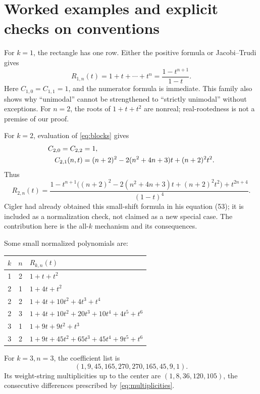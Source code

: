 \documentclass[11pt,a4paper]{article}
\theoremstyle{definition}
\theoremstyle{remark}
\numberwithin{equation}{section}
\begin{document}
\section{Worked examples and explicit checks on conventions}
\label{sec:examples}
For \(k=1\), the rectangle has one row. Either the positive formula or
Jacobi--Trudi gives
\begin{equation}
 R_{1,n}(t)=1+t+\cdots+t^n=\frac{1-t^{n+1}}{1-t}.
 \label{eq:k1}
\end{equation}
Here \(C_{1,0}=C_{1,1}=1\), and the numerator formula is immediate.
This family also shows why ``unimodal'' cannot be strengthened to
``strictly unimodal'' without exceptions. For \(n=2\), the roots of
\(1+t+t^2\) are nonreal; real-rootedness is not a premise of our proof.

For \(k=2\), evaluation of \eqref{eq:blocks} gives
\begin{align}
 C_{2,0}=C_{2,2}&=1,\notag\\
 C_{2,1}(n,t)&=(n+2)^2-2(n^2+4n+3)t+(n+2)^2t^2.
 \label{eq:k2C}
\end{align}
Thus
\begin{equation}
 R_{2,n}(t)=
 \frac{1-t^{n+1}\bigl((n+2)^2-2(n^2+4n+3)t+(n+2)^2t^2\bigr)
       +t^{2n+4}}{(1-t)^4}.
 \label{eq:k2}
\end{equation}
Cigler had already obtained this small-shift formula in his equation (53);
it is included as a normalization check, not claimed as a new special case.
The contribution here is the all-\(k\) mechanism and its consequences.

Some small normalized polynomials are:
\begin{center}
\small
\begin{tabular}{@{}ccl@{}}
\toprule
\(k\)&\(n\)&\(R_{k,n}(t)\)\\
\midrule
1&2&\(1+t+t^2\)\\
2&1&\(1+4t+t^2\)\\
2&2&\(1+4t+10t^2+4t^3+t^4\)\\
2&3&\(1+4t+10t^2+20t^3+10t^4+4t^5+t^6\)\\
3&1&\(1+9t+9t^2+t^3\)\\
3&2&\(1+9t+45t^2+65t^3+45t^4+9t^5+t^6\)\\
\bottomrule
\end{tabular}
\end{center}
For \(k=3,n=3\), the coefficient list is
\[
 (1,9,45,165,270,270,165,45,9,1).
\]
Its weight-string multiplicities up to the center are
\((1,8,36,120,105)\), the consecutive differences prescribed by
\eqref{eq:multiplicities}.
\end{document}
